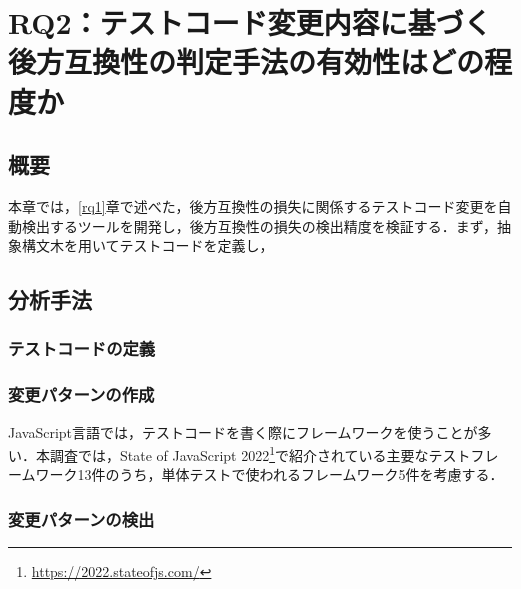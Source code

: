 \documentclass[11pt,dvipdfmx]{jreport}
\begin{document}
\chapter{RQ2：テストコード変更内容に基づく後方互換性の判定手法の有効性はどの程度か}

\section{概要}
本章では，\ref{rq1}章で述べた，後方互換性の損失に関係するテストコード変更を自動検出するツールを開発し，後方互換性の損失の検出精度を検証する．まず，抽象構文木を用いてテストコードを定義し，







\section{分析手法}

\subsection{テストコードの定義}

\subsection{変更パターンの作成}
JavaScript言語では，テストコードを書く際にフレームワークを使うことが多い．本調査では，State of JavaScript 2022\footnote{\url{https://2022.stateofjs.com/}}で紹介されている主要なテストフレームワーク13件のうち，単体テストで使われるフレームワーク5件を考慮する．

\subsection{変更パターンの検出}
\end{document}
